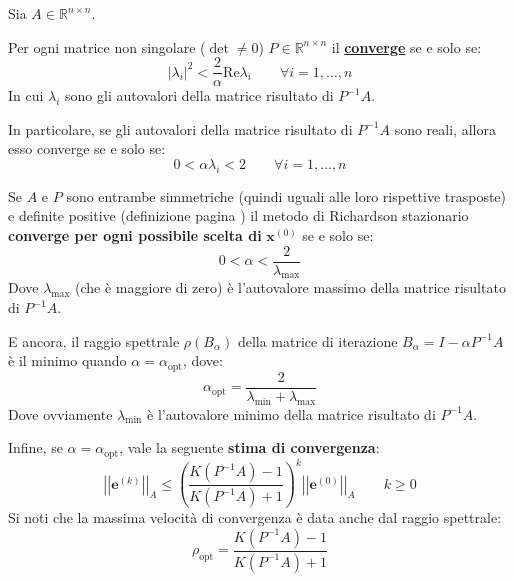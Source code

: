 \begin{definitionbox}
    Sia $A \in \mathbb{R}^{n \times n}$.

    Per ogni matrice non singolare ($\det \ne 0$) $P \in \mathbb{R}^{n \times n}$ il  \underline{\textbf{converge}} se e solo se:
    \begin{equation*}
        \left| \lambda_{i} \right|^{2} < \dfrac{2}{\alpha} \mathrm{Re}\lambda_{i} \hspace{2em} \forall i = 1, \dots, n
    \end{equation*}
    In cui $\lambda_{i}$ sono gli autovalori della matrice risultato di $P^{-1} A$.

    \highspace
    In particolare, se gli autovalori della matrice risultato di $P^{-1} A$ sono reali, allora esso converge se e solo se:
    \begin{equation*}
        0 < \alpha \lambda_{i} < 2 \hspace{2em} \forall i = 1, \dots, n
    \end{equation*}

    \highspace
    Se $A$ e $P$ sono entrambe simmetriche (quindi uguali alle loro rispettive trasposte) e definite positive (definizione pagina \pageref{matrice definita positiva}) il metodo di Richardson stazionario \textbf{converge per ogni possibile scelta di} $\mathbf{x}^{\left(0\right)}$ se e solo se:
    \begin{equation*}
        0 < \alpha < \dfrac{2}{\lambda_{\max}}
    \end{equation*}
    Dove $\lambda_{\max}$ (che è maggiore di zero) è l'autovalore massimo della matrice risultato di $P^{-1} A$.

    \highspace
    E ancora, il raggio spettrale $\rho\left(B_{\alpha}\right)$ della matrice di iterazione $B_{\alpha} = I - \alpha P^{-1}A$ è il minimo quando $\alpha = \alpha_{\text{opt}}$, dove:
    \begin{equation}
        \alpha_{\text{opt}} = \dfrac{2}{\lambda_{\min} + \lambda_{\max}}
    \end{equation}
    Dove ovviamente $\lambda_{\min}$ è l'autovalore minimo della matrice risultato di $P^{-1} A$.

    \highspace
    Infine, se $\alpha = \alpha_{\text{opt}}$, vale la seguente \textbf{stima di convergenza}:
    \begin{equation}
        \left|\left| \mathbf{e}^{\left(k\right)} \right|\right|_{A} \le \left(
            \dfrac{K \left(P^{-1}A\right)-1}{K \left(P^{-1}A\right)+1}
        \right)^{k}
        \left|\left| \mathbf{e}^{\left(0\right)} \right|\right|_{A}
        \hspace{2em} k \ge 0
    \end{equation}
    Si noti che la massima velocità di convergenza è data anche dal raggio spettrale:
    \begin{equation}
        \rho_{\text{opt}} = \dfrac{K \left(P^{-1}A\right)-1}{K \left(P^{-1}A\right)+1}
    \end{equation}
\end{definitionbox}

